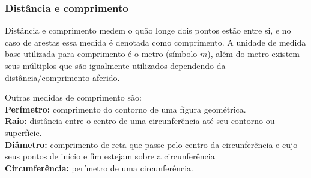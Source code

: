 \begin{multicols*}{2}
    \subsubsection*{Distância e comprimento}
    Distância e comprimento medem o quão longe dois pontos estão entre si, e no caso de arestas essa medida é 
    denotada como comprimento. A unidade de medida base utilizada para comprimento é o metro (símbolo ${m}$), além do 
    metro existem seus múltiplos que são igualmente utilizados dependendo da distância/comprimento aferido.
    \begin{table}[H]
    \end{table}
    Outras medidas de comprimento são: \\
    \textbf{Perímetro:} comprimento do contorno de uma fígura geométrica. \\
    \textbf{Raio:} distância entre o centro de uma circunferência até seu contorno ou superfície.\\
    \textbf{Diâmetro:} comprimento de reta que passe pelo centro da circunferência e cujo seus pontos de 
    início e fim estejam sobre a circunferência\\
    \textbf{Circunferência:} perímetro de uma circunferência.\\


\end{multicols*}
